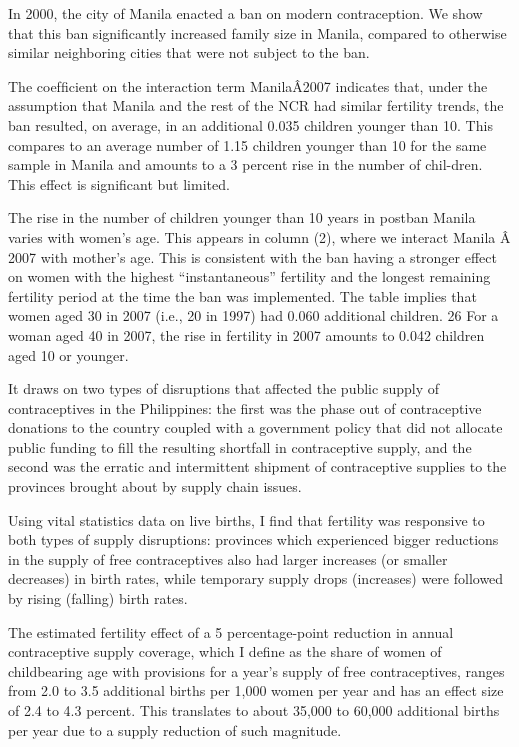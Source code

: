 \documentclass[letterpaper,12pt]{article}
\begin{document}
\citet{Dumas2017}

In 2000, the city of Manila enacted a ban on modern contraception. We
show that this ban signiﬁcantly increased family size in Manila,
compared to otherwise similar neighboring cities that were not subject
to the ban.

The coefﬁcient on the interaction term ManilaÂ2007 indicates that, under
the assumption that Manila and the rest of the NCR had similar fertility
trends, the ban resulted, on average, in an additional 0.035 children
younger than 10. This compares to an average number of 1.15 children
younger than 10 for the same sample in Manila and amounts to a 3 percent
rise in the number of chil-dren. This effect is signiﬁcant but limited.

The rise in the number of children younger than 10 years in postban
Manila varies with women’s age. This appears in column (2), where we
interact Manila Â 2007 with mother’s age. This is consistent with the
ban having a stronger effect on women with the highest “instantaneous”
fertility and the longest remaining fertility period at the time the ban
was implemented. The table implies that women aged 30 in 2007 (i.e., 20
in 1997) had 0.060 additional children. 26 For a woman aged 40 in 2007,
the rise in fertility in 2007 amounts to 0.042 children aged 10 or
younger.

\citep{Salas2014}

It draws on two types of disruptions that affected the public supply of
contraceptives in the Philippines: the ﬁrst was the phase out of
contraceptive donations to the country coupled with a government policy
that did not allocate public funding to ﬁll the resulting shortfall in
contraceptive supply, and the second was the erratic and intermittent
shipment of contraceptive supplies to the provinces brought about by
supply chain issues.

Using vital statistics data on live births, I ﬁnd that fertility was
responsive to both types of supply disruptions: provinces which
experienced bigger reductions in the supply of free contraceptives also
had larger increases (or smaller decreases) in birth rates, while
temporary supply drops (increases) were followed by rising (falling)
birth rates.

The estimated fertility effect of a 5 percentage-point reduction in
annual contraceptive supply coverage, which I deﬁne as the share of
women of childbearing age with provisions for a year’s supply of free
contraceptives, ranges from 2.0 to 3.5 additional births per 1,000 women
per year and has an effect size of 2.4 to 4.3 percent. This translates
to about 35,000 to 60,000 additional births per year due to a supply
reduction of such magnitude.
\end{document}

